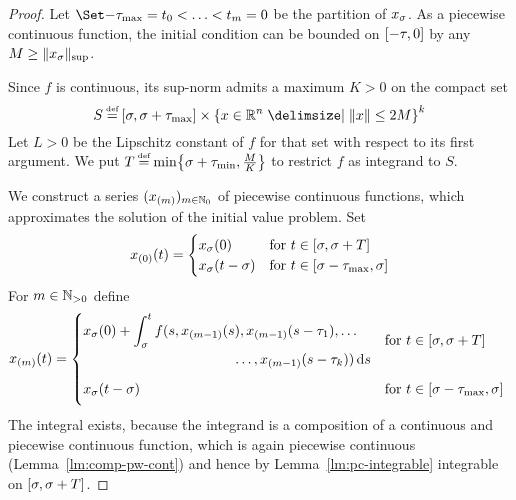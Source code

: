     \begin{proof}
        Let $\partition{-\taumax=t_0}{t_m=0}$ be the partition of $x_{\sigma}$. As a piecewise continuous function, the initial condition can be bounded on $[-\tau,0]$ by any $M\geq \lVert x_\sigma\rVert_{\sup}$.      
        
        Since $f$ is continuous, its sup-norm admits a maximum $K>0$
        on the compact set
        \begin{equation*}
            S\defeq\compactum{\tzero}{\tzero+\taumax} \times \set{x\in\R^n\with \nnorm{x}\leq 2M}^k
        \end{equation*}
        Let $L>0$ be the Lipschitz constant of $f$ for that set with respect to its first argument.
        We put $T\defeq\min\set{\tzero+\taumin,\frac{M}{K}}$ to restrict $f$ as integrand to $S$.

        We construct a series $(x_{(m)})_{m\in\mathbb{N}_0}$ of piecewise continuous functions, which approximates the solution of the initial value problem. Set
        \begin{equation*}
            x_{(0)}(t)= \begin{cases}
                x_\sigma(0) & \text{for } t\in[\sigma,\sigma+T]\\
                x_\sigma(t-\sigma) & \text{for } t\in[\sigma-\tau_{\max},\sigma]
            \end{cases}
        \end{equation*}
        For $m\in\mathbb{N}_{>0}$ define
        \begin{equation*}
            x_{(m)}(t)= \begin{dcases*}
                \begin{multlined}[c][0.57\displaywidth]
                    x_\tzero(0) + \integral{\tzero}{t}
                f(s,x_{(m-1)}(s),x_{(m-1)}(s-\tau_1),\ldots\\
                \ldots,x_{(m-1)}(s-\tau_k))\dx[s] 
                \end{multlined} & for $t\in\compactum{\tzero}{\tzero+T}$\\
                x_\tzero(t-\tzero) \vphantom{\int} & for $t\in\compactum{\tzero-\taumax}{\tzero}$
            \end{dcases*}
        \end{equation*}
        The integral exists, because the integrand is a composition of a continuous and piecewise continuous function, which is again piecewise continuous (Lemma~\ref{lm:comp-pw-cont}) and hence by Lemma~\ref{lm:pc-integrable} integrable on $[\sigma,\sigma+T]$.


\end{proof}
